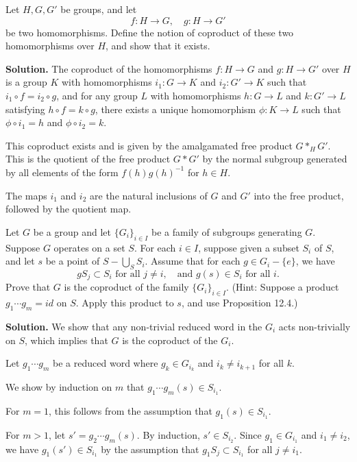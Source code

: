 \begin{problembox}
Let $H, G, G'$ be groups, and let
\[f: H \rightarrow G, \quad g: H \rightarrow G'\]
be two homomorphisms. Define the notion of coproduct of these two homomorphisms over $H$, and show that it exists.
\end{problembox}

\noindent\textbf{Solution.} The coproduct of the homomorphisms $f: H \to G$ and $g: H \to G'$ over $H$ is a group $K$ with homomorphisms $i_1: G \to K$ and $i_2: G' \to K$ such that $i_1 \circ f = i_2 \circ g$, and for any group $L$ with homomorphisms $h: G \to L$ and $k: G' \to L$ satisfying $h \circ f = k \circ g$, there exists a unique homomorphism $\phi: K \to L$ such that $\phi \circ i_1 = h$ and $\phi \circ i_2 = k$.

This coproduct exists and is given by the amalgamated free product $G *_H G'$. This is the quotient of the free product $G * G'$ by the normal subgroup generated by all elements of the form $f(h)g(h)^{-1}$ for $h \in H$.

The maps $i_1$ and $i_2$ are the natural inclusions of $G$ and $G'$ into the free product, followed by the quotient map.

\begin{problembox}
Let $G$ be a group and let $\{G_i\}_{i \in I}$ be a family of subgroups generating $G$. Suppose $G$ operates on a set $S$. For each $i \in I$, suppose given a subset $S_i$ of $S$, and let $s$ be a point of $S - \bigcup_S S_i$. Assume that for each $g \in G_i - \{e\}$, we have
\[gS_j \subset S_i \text{ for all } j \neq i, \quad \text{and } g(s) \in S_i \text{ for all } i.\]
Prove that $G$ is the coproduct of the family $\{G_i\}_{i \in I}$. (Hint: Suppose a product $g_1 \cdots g_m = id$ on $S$. Apply this product to $s$, and use Proposition 12.4.)
\end{problembox}

\noindent\textbf{Solution.} We show that any non-trivial reduced word in the $G_i$ acts non-trivially on $S$, which implies that $G$ is the coproduct of the $G_i$.

Let $g_1 \cdots g_m$ be a reduced word where $g_k \in G_{i_k}$ and $i_k \neq i_{k+1}$ for all $k$.

We show by induction on $m$ that $g_1 \cdots g_m(s) \in S_{i_1}$.

For $m = 1$, this follows from the assumption that $g_1(s) \in S_{i_1}$.

For $m > 1$, let $s' = g_2 \cdots g_m(s)$. By induction, $s' \in S_{i_2}$. Since $g_1 \in G_{i_1}$ and $i_1 \neq i_2$, we have $g_1(s') \in S_{i_1}$ by the assumption that $g_1S_j \subset S_{i_1}$ for all $j \neq i_1$.

